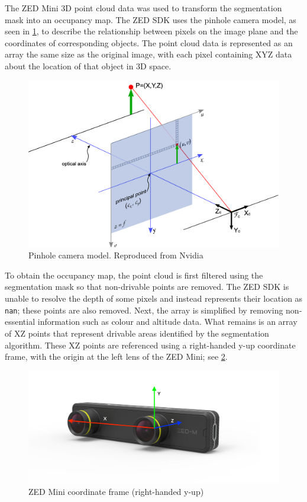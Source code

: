The ZED Mini 3D point cloud data was used
to transform the segmentation mask into an occupancy map.
The ZED SDK uses the pinhole camera model, as seen in \cref{fig:pinhole_camera_model},
to describe the relationship between pixels on the image plane
and the coordinates of corresponding objects.
The point cloud data is represented as an array the same size as
the original image, with each pixel containing XYZ data about the location of that object
in 3D space.
\begin{figure}[b]
    \centering
    \includegraphics[width=0.8\linewidth]{images/pinhole_camera_model.png}
    \caption{Pinhole camera model. Reproduced from Nvidia \cite{nvidiaVisionProgrammingInterface}}
    \label{fig:pinhole_camera_model}
\end{figure}

To obtain the occupancy map, the point cloud is first filtered using the segmentation mask so that
non-drivable points are removed. The ZED SDK is unable to resolve the depth of some pixels
and instead represents their location as \texttt{nan}; these points are also removed.
Next, the array is simplified by removing non-essential information such as colour and altitude
data. What remains is an array of XZ points that represent drivable areas
identified by the segmentation algorithm. These XZ points are referenced
using a right-handed y-up coordinate frame, with the origin at the left lens of the ZED Mini;
see \cref{fig:zed_mini_coordinate_frame}.
\begin{figure}[b]
    \centering
    \includegraphics[width=0.8\linewidth]{images/zed_mini_coordinate_frame.jpg}
    \caption{ZED Mini coordinate frame (right-handed y-up)}
    \label{fig:zed_mini_coordinate_frame}
\end{figure}

